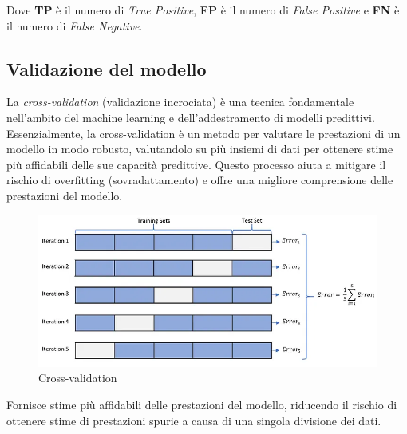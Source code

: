 Dove \textbf{TP} è il numero di \textit{True Positive}, \textbf{FP} è il numero di \textit{False Positive} e \textbf{FN} è il numero di \textit{False Negative}.

\subsection{Validazione del modello}

La \textit{cross-validation} (validazione incrociata) è una tecnica fondamentale nell'ambito del machine learning e dell'addestramento di modelli predittivi. Essenzialmente, la cross-validation è un metodo per valutare le prestazioni di un modello in modo robusto, valutandolo su più insiemi di dati per ottenere stime più affidabili delle sue capacità predittive. Questo processo aiuta a mitigare il rischio di overfitting (sovradattamento) e offre una migliore comprensione delle prestazioni del modello.

\begin{figure}[!ht]
	\begin{adjustbox}{width=0.7\columnwidth, center}
		\includegraphics{./images/cross_validation.png}
	\end{adjustbox}
  \caption{Cross-validation}
  \label{fig:cross_validation}
\end{figure}

Fornisce stime più affidabili delle prestazioni del modello, riducendo il rischio di ottenere stime di prestazioni spurie a causa di una singola divisione dei dati.


